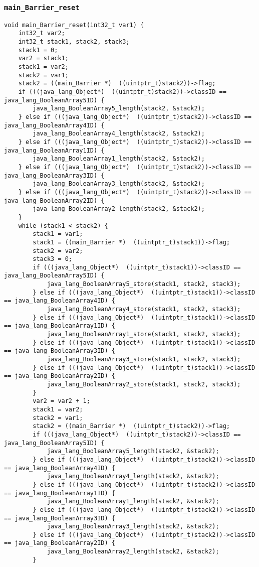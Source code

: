 \begin{landscape}
\begin{multicols}{2}
\subsubsection{\texttt{main\_Barrier\_reset}}

\begin{lstlisting}[firstnumber=2362]
void main_Barrier_reset(int32_t var1) {
	int32_t var2;
	int32_t stack1, stack2, stack3;
	stack1 = 0;
	var2 = stack1;
	stack1 = var2;
	stack2 = var1;
	stack2 = ((main_Barrier *)  ((uintptr_t)stack2))->flag;
	if (((java_lang_Object*)  ((uintptr_t)stack2))->classID == java_lang_BooleanArray5ID) {
		java_lang_BooleanArray5_length(stack2, &stack2);
	} else if (((java_lang_Object*)  ((uintptr_t)stack2))->classID == java_lang_BooleanArray4ID) {
		java_lang_BooleanArray4_length(stack2, &stack2);
	} else if (((java_lang_Object*)  ((uintptr_t)stack2))->classID == java_lang_BooleanArray1ID) {
		java_lang_BooleanArray1_length(stack2, &stack2);
	} else if (((java_lang_Object*)  ((uintptr_t)stack2))->classID == java_lang_BooleanArray3ID) {
		java_lang_BooleanArray3_length(stack2, &stack2);
	} else if (((java_lang_Object*)  ((uintptr_t)stack2))->classID == java_lang_BooleanArray2ID) {
		java_lang_BooleanArray2_length(stack2, &stack2);
	}
	while (stack1 < stack2) {
		stack1 = var1;
		stack1 = ((main_Barrier *)  ((uintptr_t)stack1))->flag;
		stack2 = var2;
		stack3 = 0;
		if (((java_lang_Object*)  ((uintptr_t)stack1))->classID == java_lang_BooleanArray5ID) {
			java_lang_BooleanArray5_store(stack1, stack2, stack3);
		} else if (((java_lang_Object*)  ((uintptr_t)stack1))->classID == java_lang_BooleanArray4ID) {
			java_lang_BooleanArray4_store(stack1, stack2, stack3);
		} else if (((java_lang_Object*)  ((uintptr_t)stack1))->classID == java_lang_BooleanArray1ID) {
			java_lang_BooleanArray1_store(stack1, stack2, stack3);
		} else if (((java_lang_Object*)  ((uintptr_t)stack1))->classID == java_lang_BooleanArray3ID) {
			java_lang_BooleanArray3_store(stack1, stack2, stack3);
		} else if (((java_lang_Object*)  ((uintptr_t)stack1))->classID == java_lang_BooleanArray2ID) {
			java_lang_BooleanArray2_store(stack1, stack2, stack3);
		}
		var2 = var2 + 1;
		stack1 = var2;
		stack2 = var1;
		stack2 = ((main_Barrier *)  ((uintptr_t)stack2))->flag;
		if (((java_lang_Object*)  ((uintptr_t)stack2))->classID == java_lang_BooleanArray5ID) {
			java_lang_BooleanArray5_length(stack2, &stack2);
		} else if (((java_lang_Object*)  ((uintptr_t)stack2))->classID == java_lang_BooleanArray4ID) {
			java_lang_BooleanArray4_length(stack2, &stack2);
		} else if (((java_lang_Object*)  ((uintptr_t)stack2))->classID == java_lang_BooleanArray1ID) {
			java_lang_BooleanArray1_length(stack2, &stack2);
		} else if (((java_lang_Object*)  ((uintptr_t)stack2))->classID == java_lang_BooleanArray3ID) {
			java_lang_BooleanArray3_length(stack2, &stack2);
		} else if (((java_lang_Object*)  ((uintptr_t)stack2))->classID == java_lang_BooleanArray2ID) {
			java_lang_BooleanArray2_length(stack2, &stack2);
		}


\end{lstlisting}
\end{multicols}
\end{landscape}
